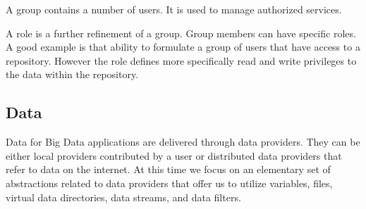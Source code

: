 \documentclass[10pt]{article}
\begin{document}
A group contains a number of users. It is used to manage authorized
services.



A role is a further refinement of a group. Group members can have
specific roles. A good example is that ability to formulate a group of
users that have access to a repository. However the role defines more
specifically read and write privileges to the data within the repository.


\subsection{Data}

Data for Big Data applications are delivered through data
providers. They can be either local providers contributed by a user or
distributed data providers that refer to data on the internet. At this
time we focus on an elementary set of abstractions related to data
providers that offer us to utilize variables, files, virtual data
directories, data streams, and data filters.
\end{document}
